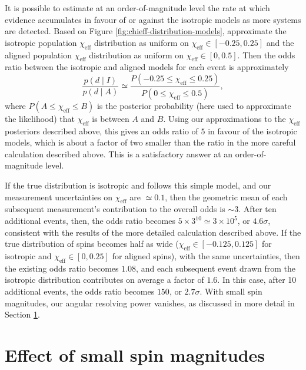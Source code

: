 \documentclass{nature}
\newcommand{\chieff}{\chi_\mathrm{eff}}
\begin{document}
\begin{methods}
It is possible to estimate at an order-of-magnitude level the rate at
which evidence accumulates in favour of or against the isotropic
models as more systems are detected.  Based on Figure
\ref{fig:chieff-distribution-models}, approximate the isotropic
population $\chieff$ distribution as uniform on
$\chieff \in \left[ -0.25, 0.25 \right]$ and the aligned population
$\chieff$ distribution as uniform on
$\chieff \in \left[0, 0.5\right]$.  Then the odds ratio between the
isotropic and aligned models for each event is approximately
\begin{equation}
  \label{eq:approx-odds}
  \frac{p\left( d \mid I \right)}{p\left( d \mid A \right)} \simeq
  \frac{P\left( -0.25 \leq \chieff \leq 0.25 \right)}{P\left( 0 \leq \chieff \leq 0.5 \right) },
\end{equation}
where $P\left( A \leq \chieff \leq B \right)$ is the posterior
probability (here used to approximate the likelihood) that $\chieff$
is between $A$ and $B$.  Using our approximations to the $\chieff$
posteriors described above, this gives an odds ratio of $5$ in favour
of the isotropic models, which is about a factor of two smaller than
the ratio in the more careful calculation described above.  This is a
satisfactory answer at an order-of-magnitude level.

If the true distribution is isotropic and follows this simple model,
and our measurement uncertainties on $\chieff$ are $\simeq 0.1$, then
the geometric mean of each subsequent measurement's contribution to
the overall odds is $\sim 3$.  After ten additional events, then, the
odds ratio becomes $5 \times 3^{10} \simeq 3 \times 10^{5}$, or
$4.6 \sigma$, consistent with the results of the more detailed
calculation described above.  If the true distribution of spins
becomes half as wide ($\chieff \in [-0.125, 0.125]$ for isotropic and
$\chieff \in [0, 0.25]$ for aligned spins), with the same
uncertainties, then the existing odds ratio becomes $1.08$, and each
subsequent event drawn from the isotropic distribution contributes on
average a factor of $1.6$.  In this case, after 10 additional events,
the odds ratio becomes $150$, or $2.7\sigma$.  With small spin
magnitudes, our angular resolving power vanishes, as discussed in more
detail in Section \ref{sec:smallspins}.

\section{Effect of small spin magnitudes}
\label{sec:smallspins}


\end{methods}
\end{document}
